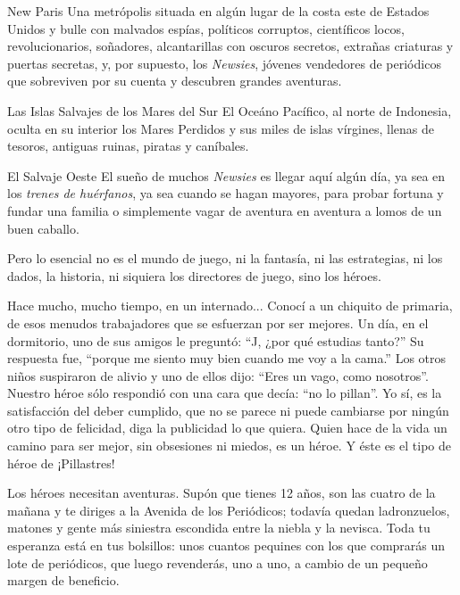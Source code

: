\begin{description}

\item{New Paris} 
Una metrópolis situada en algún lugar de la costa este de Estados Unidos y bulle con malvados espías, políticos corruptos, científicos locos, revolucionarios, soñadores, alcantarillas con oscuros secretos, extrañas criaturas y puertas secretas, y, por supuesto, los \emph{Newsies}, jóvenes vendedores de periódicos que sobreviven por su cuenta y descubren grandes aventuras.

\item{Las Islas Salvajes de los Mares del Sur}
El Oceáno Pacífico, al norte de Indonesia, oculta en su interior los Mares Perdidos y sus miles de islas vírgines, llenas de tesoros, antiguas ruinas, piratas y caníbales.

\item{El Salvaje Oeste}
El sueño de muchos \emph{Newsies} es llegar aquí algún día, ya sea en los \emph{trenes de huérfanos}, ya sea cuando se hagan mayores, para probar fortuna y fundar una familia o simplemente vagar de aventura en aventura a lomos de un buen caballo.

\end{description}

Pero lo esencial no es el mundo de juego, ni la fantasía, ni las estrategias, ni los dados, la historia, ni siquiera los directores de juego, sino los héroes.


Hace mucho, mucho tiempo, en un internado... Conocí a un chiquito de primaria, de esos menudos trabajadores que se esfuerzan por ser mejores. Un día, en el dormitorio, uno de sus amigos le preguntó: \enquote{J, ¿por qué estudias tanto?} Su respuesta fue, \enquote{porque me siento muy bien cuando me voy a la cama.} Los otros niños suspiraron de alivio y uno de ellos dijo: \enquote{Eres un vago, como nosotros}. Nuestro héroe sólo respondió con una cara que decía: \enquote{no lo pillan}. Yo sí, es la satisfacción del deber cumplido, que no se parece ni puede cambiarse por ningún otro tipo de felicidad, diga la publicidad lo que quiera. Quien hace de la vida un camino para ser mejor, sin obsesiones ni miedos, es un héroe. Y éste es el tipo de héroe de ¡Pillastres!


Los héroes necesitan aventuras. Supón que tienes 12 años, son las cuatro de la mañana y te diriges a la Avenida de los Periódicos; todavía quedan ladronzuelos, matones y gente más siniestra escondida entre la niebla y la nevisca. Toda tu esperanza está en tus bolsillos: unos cuantos pequines con los que comprarás un lote de periódicos, que luego revenderás, uno a uno, a cambio de un pequeño margen de beneficio.

